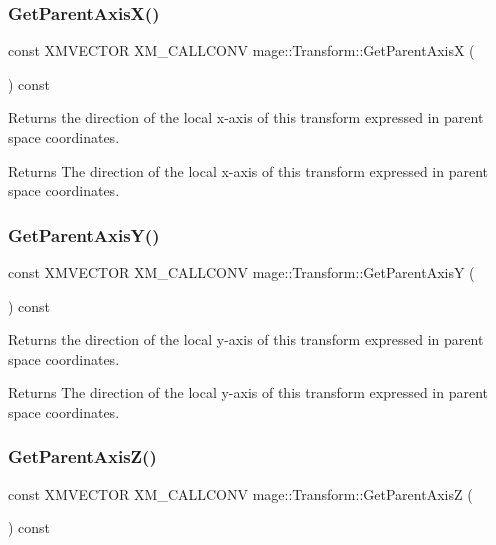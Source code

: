 \subsubsection{\texorpdfstring{Get\+Parent\+Axis\+X()}{GetParentAxisX()}}
{\footnotesize\ttfamily const X\+M\+V\+E\+C\+T\+OR X\+M\+\_\+\+C\+A\+L\+L\+C\+O\+NV mage\+::\+Transform\+::\+Get\+Parent\+AxisX (\begin{DoxyParamCaption}{ }\end{DoxyParamCaption}) const\hspace{0.3cm}{\ttfamily [noexcept]}}

Returns the direction of the local x-\/axis of this transform expressed in parent space coordinates.

\begin{DoxyReturn}{Returns}
The direction of the local x-\/axis of this transform expressed in parent space coordinates. 
\end{DoxyReturn}
\hypertarget{classmage_1_1_transform_a81c1514a624946249e9c7ec65871b599}{}\label{classmage_1_1_transform_a81c1514a624946249e9c7ec65871b599} 
\subsubsection{\texorpdfstring{Get\+Parent\+Axis\+Y()}{GetParentAxisY()}}
{\footnotesize\ttfamily const X\+M\+V\+E\+C\+T\+OR X\+M\+\_\+\+C\+A\+L\+L\+C\+O\+NV mage\+::\+Transform\+::\+Get\+Parent\+AxisY (\begin{DoxyParamCaption}{ }\end{DoxyParamCaption}) const\hspace{0.3cm}{\ttfamily [noexcept]}}

Returns the direction of the local y-\/axis of this transform expressed in parent space coordinates.

\begin{DoxyReturn}{Returns}
The direction of the local y-\/axis of this transform expressed in parent space coordinates. 
\end{DoxyReturn}
\hypertarget{classmage_1_1_transform_ab5ce18e39ad529b2e87ff0df1125f076}{}\label{classmage_1_1_transform_ab5ce18e39ad529b2e87ff0df1125f076} 
\subsubsection{\texorpdfstring{Get\+Parent\+Axis\+Z()}{GetParentAxisZ()}}
{\footnotesize\ttfamily const X\+M\+V\+E\+C\+T\+OR X\+M\+\_\+\+C\+A\+L\+L\+C\+O\+NV mage\+::\+Transform\+::\+Get\+Parent\+AxisZ (\begin{DoxyParamCaption}{ }\end{DoxyParamCaption}) const\hspace{0.3cm}{\ttfamily [noexcept]}}

